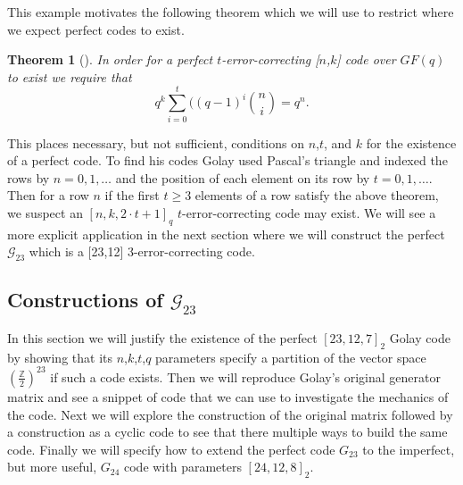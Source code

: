 \documentclass[paper=a4, fontsize=11pt]{scrartcl} %
\numberwithin{equation}{section} %
\numberwithin{figure}{section} %
\numberwithin{table}{section} %
\theoremstyle{break}
\newtheorem{thm}{Theorem}
\begin{document}
This example motivates the following theorem which we will use to restrict where we expect perfect codes to exist.

\begin{thm}[\cite{pless}]
In order for a perfect $t$-error-correcting [$n$,$k$] code over $GF(q)$ to exist we require that
$$
q^k \sum_{i=0}^t ((q-1)^i{n \choose i} = q^n. 
$$
\end{thm}

This places necessary, but not sufficient, conditions on $n$,$t$, and $k$ for the existence of a perfect code. To find his codes Golay used Pascal's triangle and indexed the rows by $n = 0, 1, \ldots$ and the position of each element on its row by $t = 0,1, \ldots$. Then for a row $n$ if the first $t \geq 3$ elements of a row satisfy the above theorem, we suspect an $[n,k, 2 \cdot t + 1]_q$ $t$-error-correcting code may exist. We will see a more explicit application in the next section where we will construct the perfect $\mathcal{G}_{23}$ which is a [23,12] 3-error-correcting code. 



\subsection{Constructions of $\mathcal{G}_{23}$}

In this section we will justify the existence of the perfect $[23,12,7]_2$ Golay code by showing that its $n$,$k$,$t$,$q$ parameters specify a partition of the vector space $(\frac{\mathbb{Z}}{2})^{23}$ if such a code exists. Then we will reproduce Golay's original generator matrix and see a snippet of code that we can use to investigate the mechanics of the code. Next we will explore the construction of the original matrix followed by a construction as a cyclic code to see that there multiple ways to build the same code. Finally we will specify how to extend the perfect code $G_{23}$ to the imperfect, but more useful, $G_{24}$ code with parameters $[24,12,8]_2$.
\end{document}
